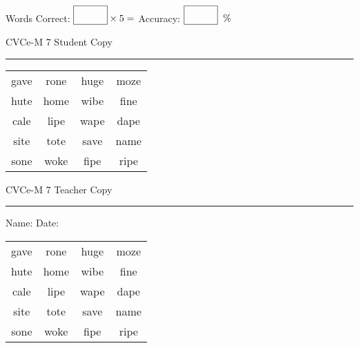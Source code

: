 \documentclass{memoir}
\begin{document}
\small

Words Correct: $\fbox{\phantom{\huge 100}} \times 5 = $ Accuracy: $\fbox{\phantom{\huge 100}}\;\; \%$ 

\vfill

\newpage


\footnotesize \noindent
CVCe-M 7 \hfill Student Copy
\smallskip
\hrule

\Large

\setlength{\tabcolsep}{14pt}
\def\arraystretch{2}

{\selectfont


\begin{vplace}[0.5]
\begin{center}
\begin{tabular}{cccc}
gave & rone & huge & moze \\
hute & home & wibe & fine \\
cale & lipe & wape & dape \\
site & tote & save & name \\
sone & woke & fipe & ripe \\
\end{tabular}
\end{center}
\end{vplace}

}

\newpage

\footnotesize \noindent
CVCe-M 7 \hfill Teacher Copy
\smallskip
\hrule

\small

\vfill

\noindent
Name: \underline{\hspace{1.75in}} \hfill Date: \underline{\hspace{1in}}

\Large

{\selectfont


\begin{vplace}[0.5]
\begin{center}
\begin{tabular}{cccc}
gave & rone & huge & moze \\
hute & home & wibe & fine \\
cale & lipe & wape & dape \\
site & tote & save & name \\
sone & woke & fipe & ripe \\
\end{tabular}
\end{center}
\end{vplace}



}
\end{document}
